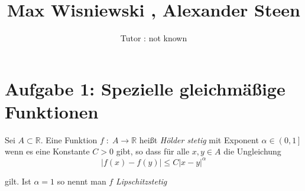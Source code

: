 \documentclass[11pt,a4paper,ngerman]{article}
\date{}
\title{Max Wisniewski , Alexander Steen}
\author{Tutor : not known}
\begin{document}

\maketitle
\thispagestyle{fancy}


\section*{Aufgabe 1: \mdseries Spezielle gleichmäßige Funktionen}

Sei $A \subset \mathbb{R}$. Eine Funktion $f \; : \; A \rightarrow \mathbb{R}$ heißt \emph{Hölder stetig} mit Exponent $\alpha \in \left( 0,1 \right]$ wenn es eine Konstante $C > 0$ gibt, so dass für alle $x,y \in A$ die Ungleichung
$$
    \left| f(x) - f(y)\right| \leq C \left| x - y \right|^\alpha
$$

gilt. Ist $\alpha = 1$ so nennt man $f$ \emph{Lipschitzstetig}
\end{document}
